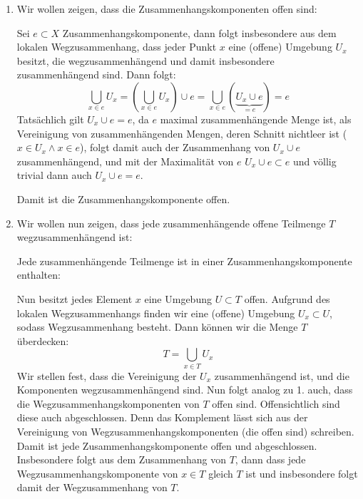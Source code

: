 \documentclass{scrartcl}
\begin{document}
\setcounter{section}{12}
\setcounter{aufgabe}{1}
\begin{aufgabe}
\begin{enumerate}
 \item Wir wollen zeigen, dass die Zusammenhangskomponenten offen sind:

Sei $e\subset X$ Zusammenhangskomponente, dann folgt insbesondere aus dem lokalen Wegzusammenhang, dass jeder Punkt $x$ eine (offene) Umgebung $U_x$ besitzt, die wegzusammenhängend und damit insbesondere zusammenhängend sind. Dann folgt:
\[
 \bigcup_{x\in e} U_x=\left ( \bigcup_{x\in e} U_x \right ) \cup e= \bigcup_{x\in e} (\underbrace{U_x \cup e}_{=e})=e
\]
Tatsächlich gilt $U_x\cup e=e$, da $e$ maximal zusammenhängende Menge ist, als Vereinigung von zusammenhängenden Mengen, deren Schnitt nichtleer ist ($x\in U_x \land x\in e$), folgt damit auch der Zusammenhang von $U_x\cup e$ zusammenhängend, und mit der Maximalität von $e$ $U_x\cup e \subset e$ und völlig trivial dann auch $U_x\cup e = e$.

Damit ist die Zusammenhangskomponente offen. 

\item Wir wollen nun zeigen, dass jede zusammenhängende offene Teilmenge $T$ wegzusammenhängend ist: 

Jede zusammenhängende Teilmenge ist in einer Zusammenhangskomponente enthalten:

Nun besitzt jedes Element $x$ eine Umgebung $ U\subset T$ offen.  Aufgrund des lokalen Wegzusammenhangs finden wir eine (offene) Umgebung $U_x\subset U$, sodass Wegzusammenhang besteht. Dann können wir die Menge $T$ überdecken:
\[
 T=\bigcup_{x\in T} U_x
\]
Wir stellen fest, dass die Vereinigung der $U_x$ zusammenhängend ist, und die Komponenten wegzusammenhängend sind. Nun folgt analog zu 1. auch, dass die Wegzusammenhangskomponenten von $T$ offen sind.  Offensichtlich sind diese auch abgeschlossen. Denn das Komplement lässt sich aus der Vereinigung von Wegzusammenhangskomponenten (die offen sind) schreiben.  Damit ist jede Zusammenhangskomponente offen und abgeschlossen. Insbesondere folgt aus dem Zusammenhang von $T$, dann dass jede Wegzusammenhangskomponente von $x\in T$ gleich $T$ ist und insbesondere folgt damit der Wegzusammenhang von $T$.
\end{enumerate}
\end{aufgabe}
\end{document}
